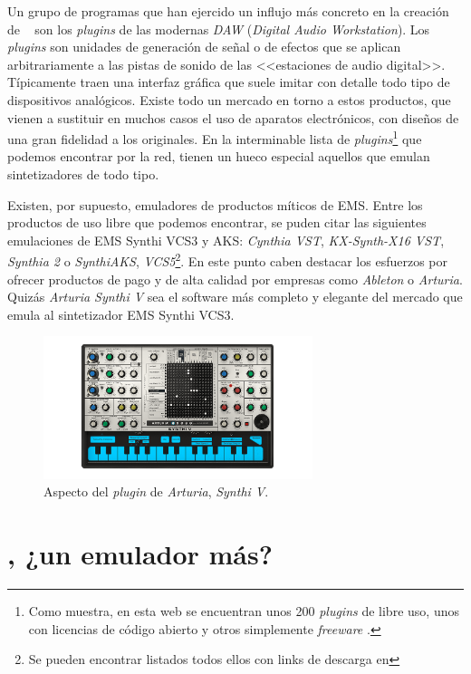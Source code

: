 Un grupo de programas que han ejercido un influjo más concreto en la creación de \appName~ son los \textit{plugins} de las modernas \textit{DAW} (\textit{Digital Audio Workstation}). Los \textit{plugins} son unidades de generación de señal o de efectos que se aplican arbitrariamente a las pistas de sonido de las <<estaciones de audio digital>>. Típicamente traen una interfaz gráfica que suele imitar con detalle todo tipo de dispositivos analógicos. Existe todo un mercado en torno a estos productos, que vienen a sustituir en muchos casos el uso de aparatos electrónicos, con diseños de una gran fidelidad a los originales. En la interminable lista de \textit{plugins}\footnote{Como muestra, en esta web se encuentran unos 200 \textit{plugins} de libre uso, unos con licencias de código abierto y otros simplemente \textit{freeware} \cite{vst_mejores}.} que podemos encontrar por la red, tienen un hueco especial aquellos que emulan sintetizadores de todo tipo. 

Existen, por supuesto, emuladores de productos míticos de EMS. Entre los productos de uso libre que podemos encontrar, se puden citar las siguientes emulaciones de EMS Synthi VCS3 y AKS: \textit{Cynthia VST}, \textit{KX-Synth-X16 VST}, \textit{Synthia 2} o \textit{SynthiAKS}, \textit{VCS5}\footnote{Se pueden encontrar listados todos ellos con links de descarga en }. En este punto caben destacar los esfuerzos por ofrecer productos de pago y de alta calidad por empresas como \textit{Ableton} o \textit{Arturia}. Quizás \textit{Arturia Synthi V} \citeyear{arturia} sea el software más completo y elegante del mercado que emula al sintetizador EMS Synthi VCS3.

\begin{figure}
	\centering
	\includegraphics[width=0.7\textwidth]{./synthi_v_arturia}
	\caption[\textit{Arturia Synthi V}]{Aspecto del \textit{plugin} de \textit{Arturia}, \textit{Synthi V}.}
	\label{fig:synthi_v_arturia}
\end{figure}


\section[\appName, ¿un emulador más?]{\appName, ¿un emulador más?}

